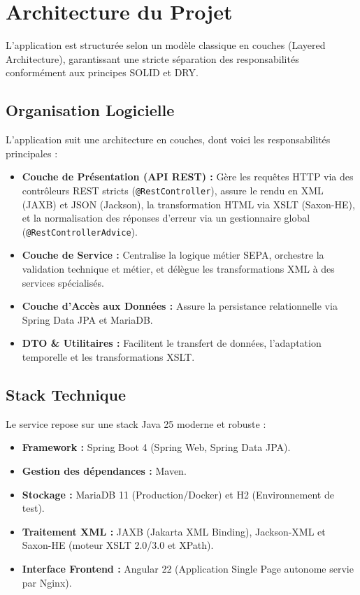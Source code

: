 \documentclass[12pt,a4paper]{article}
\begin{document}
\newpage

\section{Architecture du Projet}

L'application est structurée selon un modèle classique en couches (Layered Architecture), garantissant une stricte séparation des responsabilités conformément aux principes SOLID et DRY.

\subsection{Organisation Logicielle}
L'application suit une architecture en couches, dont voici les responsabilités principales :
\begin{itemize}
    \item \textbf{Couche de Présentation (API REST) :} Gère les requêtes HTTP via des contrôleurs REST stricts (\texttt{@RestController}), assure le rendu en XML (JAXB) et JSON (Jackson), la transformation HTML via XSLT (Saxon-HE), et la normalisation des réponses d'erreur via un gestionnaire global (\texttt{@RestControllerAdvice}).
    \item \textbf{Couche de Service :} Centralise la logique métier SEPA, orchestre la validation technique et métier, et délègue les transformations XML à des services spécialisés.
    \item \textbf{Couche d'Accès aux Données :} Assure la persistance relationnelle via Spring Data JPA et MariaDB.
    \item \textbf{DTO \& Utilitaires :} Facilitent le transfert de données, l'adaptation temporelle et les transformations XSLT.
\end{itemize}

\subsection{Stack Technique}
Le service repose sur une stack Java 25 moderne et robuste :
\begin{itemize}
    \item \textbf{Framework :} Spring Boot 4 (Spring Web, Spring Data JPA).
    \item \textbf{Gestion des dépendances :} Maven.
    \item \textbf{Stockage :} MariaDB 11 (Production/Docker) et H2 (Environnement de test).
    \item \textbf{Traitement XML :} JAXB (Jakarta XML Binding), Jackson-XML et Saxon-HE (moteur XSLT 2.0/3.0 et XPath).
    \item \textbf{Interface Frontend :} Angular 22 (Application Single Page autonome servie par Nginx).
\end{itemize}
\end{document}
